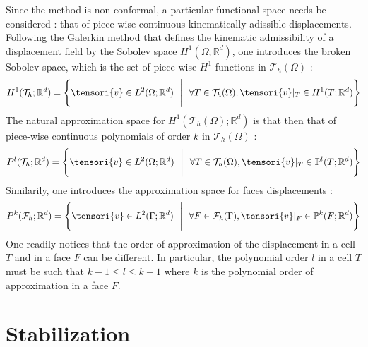     Since the method is non-conformal, a particular functional space needs be considered : that of piece-wise continuous kinematically adissible displacements. Following the Galerkin method that defines the kinematic admissibility of a displacement field by the Sobolev space $H^1(\Omega;\mathbb{R}^d)$, one introduces the broken Sobolev space, which is the set of piece-wise $H^1$ functions in $\mathcal{T}_h(\Omega)$ :
    \begin{equation}
        H^1(\mathcal{T}_h;\mathbb{R}^d) = 
        \Bigg\{
            \tensori{v} \in L^2(\Omega;\mathbb{R}^d)
            \ \ \Bigg\vert \ \ 
            \forall T \in \mathcal{T}_h(\Omega), \tensori{v}\vert_T \in H^1(T;\mathbb{R}^d)
        \Bigg\}
    \end{equation}
    The natural approximation space for $H^1(\mathcal{T}_h(\Omega);\mathbb{R}^d)$ is that then that of piece-wise continuous polynomials of order $k$ in $\mathcal{T}_h(\Omega)$ :
    \begin{equation}
        P^l(\mathcal{T}_h;\mathbb{R}^d) = 
        \Bigg\{
            \tensori{v} \in L^2(\Omega;\mathbb{R}^d)
            \ \ \Bigg\vert \ \ 
            \forall T \in \mathcal{T}_h(\Omega), \tensori{v}\vert_T \in \mathbb{P}^l(T;\mathbb{R}^d)
        \Bigg\}
    \end{equation}
    Similarily, one introduces the approximation space for faces displacements :
    \begin{equation}
        P^k(\mathcal{F}_h;\mathbb{R}^d) = 
        \Bigg\{
            \tensori{v} \in L^2(\Gamma;\mathbb{R}^d)
            \ \ \Bigg\vert \ \ 
            \forall F \in \mathcal{F}_h(\Gamma), \tensori{v}\vert_F \in \mathbb{P}^k(F;\mathbb{R}^d)
        \Bigg\}
    \end{equation}
    One readily notices that the order of approximation of the displacement in a cell $T$ and in a face $F$ can be different. In particular, the polynomial order $l$ in a cell $T$ must be such that $k-1 \leq l \leq k+1$ where $k$ is the polynomial order of approximation in a face $F$.

\section{Stabilization}
    
